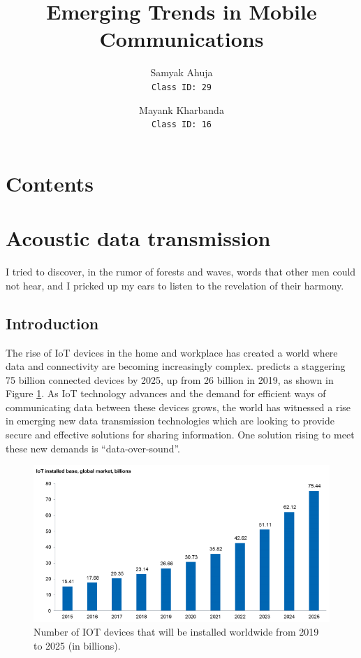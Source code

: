 \documentclass[notitlepage,hidelinks]{article}
\title{Emerging Trends in Mobile Communications}
\author{
    Samyak Ahuja \\
    \texttt{Class ID: 29}
    \and
    Mayank Kharbanda \\
    \texttt{Class ID: 16}
}
\makeatletter
\newcommand*{\toccontents}{\@starttoc{toc}}
\makeatother
\begin{document}
\vspace{0.5in}
\maketitle

\vspace{1in}
\section*{Contents}
\toccontents
\newpage


\section{Acoustic data transmission}
\epigraph{ I tried to discover, in the rumor of forests and waves, words
that other men could not hear, and I pricked up my ears to listen to the
revelation of their harmony.}{\textcite{november05}}

\subsection{Introduction}
The rise of IoT devices in the home and workplace has created a world where
data and connectivity are becoming increasingly complex. \textcite{ihs16}
predicts a staggering 75 billion connected devices by 2025, up from 26 billion
in 2019, as shown in Figure \ref{fig:ihs_iot}.  As IoT technology advances and the
demand for efficient ways of communicating data between these devices grows,
the world has witnessed a rise in emerging new data transmission technologies
which are looking to provide secure and effective solutions for sharing
information. One solution rising to meet these new demands is “data-over-sound”.

\begin{figure}[!h]
  \includegraphics[width=\linewidth]{res/iot_market_trend.png}
    \caption{Number of IOT devices that will be installed worldwide from 2019
    to 2025 (in billions).}
  \label{fig:ihs_iot}
\end{figure}
\end{document}
